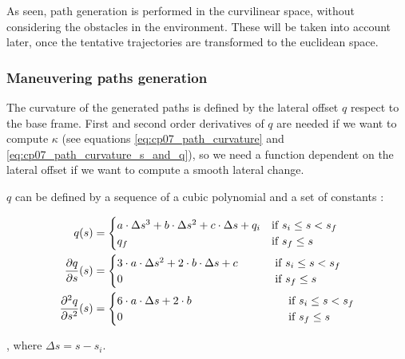 As seen, path generation is performed in the curvilinear space, without considering the obstacles in the environment. These will be taken into account later, once the tentative trajectories are transformed to the euclidean space.

\subsubsection{Maneuvering paths generation}\label{ch:chapter07_01_03_01}

The curvature of the generated paths is defined by the lateral offset $q$ respect to the base frame. First and second order derivatives of $q$ are needed if we want to compute $\kappa$ (see equations \ref{eq:cp07_path_curvature} and \ref{eq:cp07_path_curvature_s_and_q}), so we need a function dependent on the lateral offset if we want to compute a smooth lateral change.

$q$ can be defined by a sequence of a cubic polynomial and a set of constants \citep{chu2012local}:

\begin{equation}\label{eq:cp07_function_q}
\begin{align*}
q(s) &=
  \begin{cases}
   a \cdot \Delta s^3 + b \cdot \Delta s^2 + c \cdot \Delta s + q_i & \text{if } s_i \le s < s_f \\
   q_f        & \text{if } s_f \le s
  \end{cases}\\
{{\partial q} \over {\partial s}}(s) &=
  \begin{cases}
   3 \cdot a \cdot \Delta s^2 + 2 \cdot b \cdot \Delta s + c & ~~~~~~~\text{if } s_i \le s < s_f \\
   0        & ~~~~~~~\text{if } s_f \le s
  \end{cases}\\
{{\partial^2 q} \over {\partial s^2}}(s) &=
  \begin{cases}
   6 \cdot a \cdot \Delta s + 2 \cdot b & ~~~~~~~~~~~~~~~~~~~~~~~\text{if } s_i \le s < s_f \\
   0        & ~~~~~~~~~~~~~~~~~~~~~~~\text{if } s_f \le s
  \end{cases}
\end{align*}
\end{equation}

, where $\Delta s = s - s_i$.

